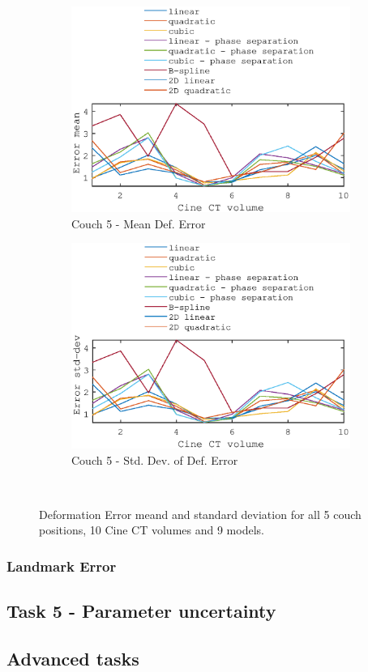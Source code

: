 \documentclass[11pt,a4paper,oneside]{report}
\begin{document}
\begin{figure}[H]
\begin{subfigure}[b]{0.5\textwidth}
    \includegraphics[width=\textwidth, trim=0 0 0 \trimval,clip=true]{figures/task4/def_mean_error_couch5.eps}
    \caption{Couch 5 - Mean Def. Error}
  \end{subfigure}%
  \begin{subfigure}[b]{0.5\textwidth}
    \includegraphics[width=\textwidth, trim=0 0 0 \trimval,clip=true]{figures/task4/def_stddev_error_couch5.eps}
    \caption{Couch 5 - Std. Dev. of Def. Error}
  \end{subfigure}
  ~
  \caption{Deformation Error meand and standard deviation for all 5 couch positions, 10 Cine CT volumes and 9 models.}
  \label{fig:c4visAss}
  
\end{figure}

\subsubsection*{Landmark Error}



\subsection*{Task 5 - Parameter uncertainty}

\subsection*{Advanced tasks}
\end{document}
